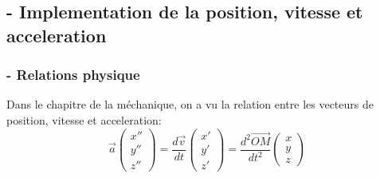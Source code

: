 \documentclass[a4paper, 12pt]{scrartcl}
\begin{document}
\subsection{- Implementation de la position, vitesse et acceleration}
\subsubsection{- Relations physique}
Dans le chapitre de la méchanique, on a vu la relation entre les vecteurs
de position, vitesse et acceleration:
\\

\[\overrightarrow{a} \begin{pmatrix} x'' \\ y'' \\ z'' \end{pmatrix}
= \frac{d\overrightarrow{v}}{d t} \begin{pmatrix} x' \\ y' \\ z' \end{pmatrix}
= \frac{d^2 \overrightarrow{OM}}{d t^2}\begin{pmatrix} x \\ y \\ z \end{pmatrix}\]
\\
\\
\end{document}
